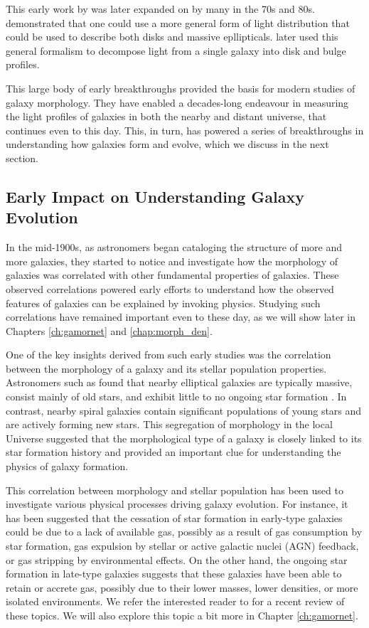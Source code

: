 This early work by \citeauthor{de_vac_48} was later expanded on by many in the 70s and 80s. \citet{sersic_63} demonstrated that one could use a more general form of light distribution that could be used to describe both disks and massive epllipticals. \citet{kormendy_77} later used this general formalism to decompose light from a single galaxy into disk and bulge profiles. 

This large body of early breakthroughs provided the basis for modern studies of galaxy morphology. They have enabled a decades-long endeavour in measuring the light profiles of galaxies in both the nearby and distant universe, that continues even to this day. This, in turn, has powered a series of breakthroughs in understanding how galaxies form and evolve, which we discuss in the next section. 

\subsection{Early Impact on Understanding Galaxy Evolution} \label{sec_intro:gal_evo}
In the mid-1900s, as astronomers began cataloging the structure of more and more galaxies, they started to notice and investigate how the morphology of galaxies was correlated with other fundamental properties of galaxies. These observed correlations powered early efforts to understand how the observed features of galaxies can be explained by invoking physics. Studying such correlations have remained important even to these day, as we will show later in Chapters \ref{ch:gamornet} and \ref{chap:morph_den}.

One of the key insights derived from such early studies was the correlation between the morphology of a galaxy and its stellar population properties. Astronomers such as \citeauthor{holmberg_58} found that nearby elliptical galaxies are typically massive, consist mainly of old stars, and exhibit little to no ongoing star formation \citep{holmberg_58}. In contrast, nearby spiral galaxies contain significant populations of young stars and are actively forming new stars. This segregation of morphology in the local Universe  suggested that the morphological type of a galaxy is closely linked to its star formation history and provided an important clue for understanding the physics of galaxy formation.

This correlation between morphology and stellar population has been used to investigate various physical processes driving galaxy evolution. For instance, it has been suggested that the cessation of star formation in early-type galaxies could be due to a lack of available gas, possibly as a result of gas consumption by star formation, gas expulsion by stellar or active galactic nuclei (AGN) feedback, or gas stripping by environmental effects. On the other hand, the ongoing star formation in late-type galaxies suggests that these galaxies have been able to retain or accrete gas, possibly due to their lower masses, lower densities, or more isolated environments. We refer the interested reader to \citet{morph_review} for a recent review of these topics. We will also explore this topic a bit more in Chapter \ref{ch:gamornet}.

